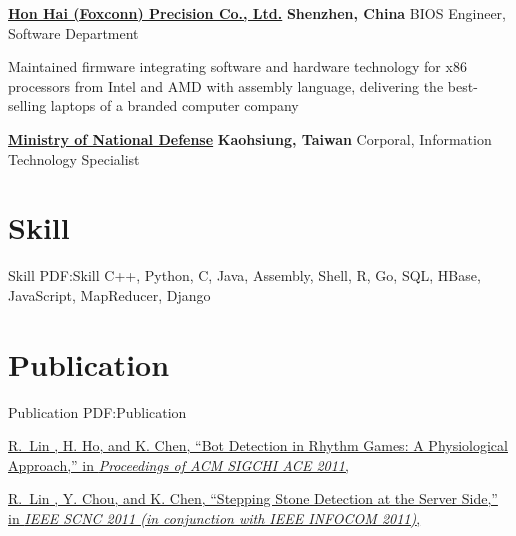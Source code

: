 \documentclass[a4paper,10pt,oneside]{article}
\newcommand{\CVNote}{CV compiled on {\today}}
\begin{document}
\begin{body}
\SmallEntryGap
\href{http://www.foxconn.com.tw/}
{\textbf{Hon Hai (Foxconn) Precision Co., Ltd.}}
\hfill
\textbf{Shenzhen, China}
BIOS Engineer, Software Department
\begin{detail}
\BulletItem
Maintained firmware integrating software and hardware technology for x86 processors from Intel and AMD with assembly language, delivering the best-selling laptops of a branded computer company 
\end{detail}

\SmallEntryGap
\href{http://www.mnd.gov.tw/english/}
{\textbf{Ministry of National Defense}}
\hfill
\textbf{Kaohsiung, Taiwan}
Corporal, Information Technology Specialist


\section{Skill}
{Skill}
{PDF:Skill}
C++, Python, C, Java, Assembly, Shell, R, Go, SQL, HBase, JavaScript, MapReducer, Django
\section{Publication}
{Publication}
{PDF:Publication}

\href{http://mmnet.iis.sinica.edu.tw/publication_detail.html?key=lin11_rhythm_bots}
{
\underline{R.~Lin} , H. Ho, and K. Chen,
``Bot Detection in Rhythm Games: A Physiological Approach,''
in \textit{Proceedings of ACM SIGCHI ACE 2011},
}

\href{http://mmnet.iis.sinica.edu.tw/publication_detail.html?key=lin11_stepping_stone}
{
\underline{R.~Lin} , Y. Chou, and K. Chen,
``Stepping Stone Detection at the Server Side,''
in \textit{IEEE SCNC 2011 (in conjunction with IEEE INFOCOM 2011)},
}







\end{body}



\end{document}
